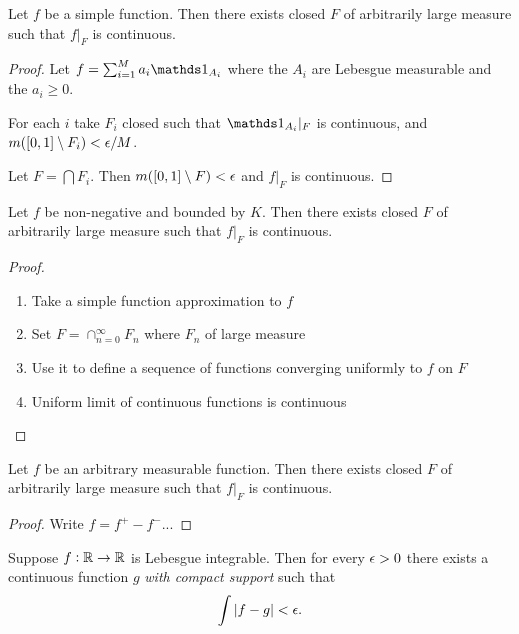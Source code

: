 \begin{claim*}
  Let $f$ be a simple function. Then there exists closed $F$ of arbitrarily large measure such that $f|_F$ is
  continuous.
\end{claim*}

\begin{proof}
  Let $f = \sum_{i=1}^M a_i\ind_{A_i}$ where the $A_i$ are Lebesgue measurable and the $a_i \geq 0$.

  For each $i$ take $F_i$ closed such that $\ind_{A_i}|_F$ is continuous, and $m([0, 1] \setminus F_i) < \epsilon/M$.

  Let $F = \bigcap F_i$. Then $m([0, 1] \setminus F) < \epsilon$ and $f|_F$ is continuous.
\end{proof}

\begin{claim*}
  Let $f$ be non-negative and bounded by $K$. Then there exists closed $F$ of arbitrarily large measure such
  that $f|_F$ is continuous.
\end{claim*}

\begin{proof}
  \begin{enumerate}
  \item Take a simple function approximation to $f$
  \item Set $F = \cap_{n=0}^\infty F_n$ where $F_n$ of large measure
  \item Use it to define a sequence of functions converging uniformly to $f$ on $F$
  \item Uniform limit of continuous functions is continuous
  \end{enumerate}
\end{proof}

\begin{claim*}
  Let $f$ be an arbitrary measurable function. Then there exists closed $F$ of arbitrarily large measure such
  that $f|_F$ is continuous.
\end{claim*}

\begin{proof}
  Write $f = f^+ - f^-$...
\end{proof}

\begin{theorem*}
  Suppose $f: \mathbb{R} \to \mathbb{R}$ is Lebesgue integrable. Then for every $\epsilon > 0$ there exists a continuous
  function $g$ {\it with compact support} such that
  \begin{align*}
    \int |f - g| < \epsilon.
  \end{align*}
\end{theorem*}

